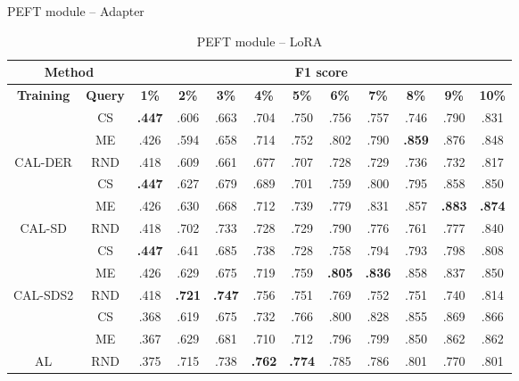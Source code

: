 \begin{table}[htbp]
\centering
\begin{subtable}{\linewidth}
\centering
\caption{PEFT module -- Adapter}

\begin{tabular}{c|c|cccccccccc}
\toprule
\multicolumn{2}{c|}{\textbf{Method}} & \multicolumn{10}{c}{\textbf{F1 score}} \\
\midrule
\textbf{Training} & \textbf{Query} & \textbf{1\%} & \textbf{2\%} & \textbf{3\%} & \textbf{4\%} & \textbf{5\%} & \textbf{6\%} & \textbf{7\%} & \textbf{8\%} & \textbf{9\%} & \textbf{10\%}\\
\midrule
 & CS & \textbf{.447} & .606 & .663 & .704 & .750 & .756 & .757 & .746 & .790 & .831\\

 & ME & .426 & .594 & .658 & .714 & .752 & .802 & .790 & \textbf{.859} & .876 & .848\\

\multirow{-3}{*}{\raggedright\arraybackslash CAL-DER} & RND & .418 & .609 & .661 & .677 & .707 & .728 & .729 & .736 & .732 & .817\\
\midrule
 & CS & \textbf{.447} & .627 & .679 & .689 & .701 & .759 & .800 & .795 & .858 & .850\\

 & ME & .426 & .630 & .668 & .712 & .739 & .779 & .831 & .857 & \textbf{.883} & \textbf{.874}\\

\multirow{-3}{*}{\raggedright\arraybackslash CAL-SD} & RND & .418 & .702 & .733 & .728 & .729 & .790 & .776 & .761 & .777 & .840\\
\midrule
 & CS & \textbf{.447} & .641 & .685 & .738 & .728 & .758 & .794 & .793 & .798 & .808\\

 & ME & .426 & .629 & .675 & .719 & .759 & \textbf{.805} & \textbf{.836} & .858 & .837 & .850\\

\multirow{-3}{*}{\raggedright\arraybackslash CAL-SDS2} & RND & .418 & \textbf{.721} & \textbf{.747} & .756 & .751 & .769 & .752 & .751 & .740 & .814\\
\midrule
 & CS & .368 & .619 & .675 & .732 & .766 & .800 & .828 & .855 & .869 & .866\\

 & ME & .367 & .629 & .681 & .710 & .712 & .796 & .799 & .850 & .862 & .862\\

\multirow{-3}{*}{\raggedright\arraybackslash AL} & RND & .375 & .715 & .738 & \textbf{.762} & \textbf{.774} & .785 & .786 & .801 & .770 & .801\\
\bottomrule
\end{tabular}
\end{subtable}
\vspace{1em}
\begin{subtable}{\linewidth}
\centering
\caption{PEFT module -- LoRA}


\end{subtable}
\end{table}
